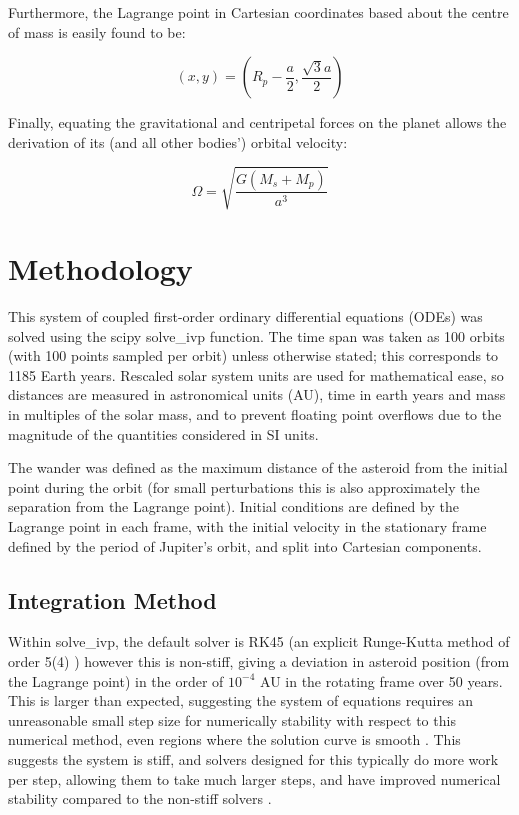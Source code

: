 \documentclass[11pt, a4paper,twocolumn]{article} %
\begin{document}
Furthermore, the Lagrange point in Cartesian coordinates based about the centre of mass is easily found to be:

\begin{equation}
(x,y) = \left( R_{p} - \frac{a}{2}, \frac{ \sqrt{3} a}{2} \right)
\end{equation}

Finally, equating the gravitational and centripetal forces on the planet allows the derivation of its (and all other bodies') orbital velocity:

\begin{equation}
\Omega = \sqrt{\frac{G (M_{s} + M_{p})}{a^{3}}}
\end{equation}

\section{Methodology}
This system of coupled first-order ordinary differential equations (ODEs) was solved using the scipy solve\_ivp function. The time span was taken as 100 orbits (with 100 points sampled per orbit) unless otherwise stated; this corresponds to 1185 Earth years. Rescaled solar system units are used for mathematical ease, so distances are measured in astronomical units (AU), time in earth years and mass in multiples of the solar mass, and to prevent floating point overflows due to the magnitude of the quantities considered in SI units.


The wander was defined as the maximum distance of the asteroid from the initial point during the orbit (for small perturbations this is also approximately the separation from the Lagrange point).
Initial conditions are defined by the Lagrange point in each frame, with the initial velocity in the stationary frame defined by the period of Jupiter's orbit, and split into Cartesian components.

\subsection{Integration Method}
Within solve\_ivp, the default solver is RK45 (an explicit Runge-Kutta method of order 5(4) \cite{Dormand1980}) however this is non-stiff, giving a deviation in asteroid position (from the Lagrange point) in the order of $ 10^{-4}$ AU in the rotating frame over 50 years. This is larger than expected, suggesting the system of equations requires an unreasonable small step size for  numerically stability with respect to this numerical method, even regions where the solution curve is smooth \cite{Lambert1991}. This suggests the system is stiff, and solvers designed for this typically do more work per step, allowing them to take much larger steps, and have improved numerical stability compared to the non-stiff solvers \cite{Byrne1987}. 
\end{document}
